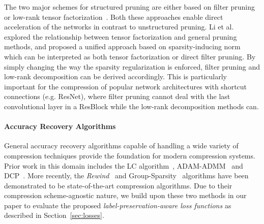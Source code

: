 The two major schemes for structured pruning are either based on filter pruning~\cite{joseph2019condensa} or low-rank tensor factorization~\cite{li2020group}. Both these approaches enable direct acceleration of the networks in contrast to unstructured pruning.
Li et al.~\cite{li2020group} explored the relationship between tensor factorization and general pruning methods, and proposed a unified approach based on sparsity-inducing norm which can be interpreted as both tensor factorization or direct filter pruning. By simply changing the way the sparsity regularization is enforced, filter pruning and low-rank decomposition can be derived accordingly. 
This is particularly important for the compression of popular network architectures with shortcut connections (e.g. ResNet), where filter pruning cannot deal with the last convolutional layer in a ResBlock while the low-rank decomposition methods can.

\paragraph{Accuracy Recovery Algorithms} General accuracy recovery algorithms capable of handling a wide variety of compression techniques provide the foundation for modern compression systems. Prior work in this domain includes the LC algorithm~\cite{carreira2017model}, ADAM-ADMM~\cite{zhang2018adam} and DCP~\cite{zhuang2018discrimination}. More recently,
the \textit{Rewind}~\cite{renda2020rewind} and Group-Sparsity~\cite{li2020group} algorithms have been demonstrated to be state-of-the-art compression algorithms.
Due to their compression scheme-agnostic nature, we build upon these two methods in our paper to evaluate the proposed \emph{label-preservation-aware loss functions} as described in Section~\ref{sec:losses}.
%

